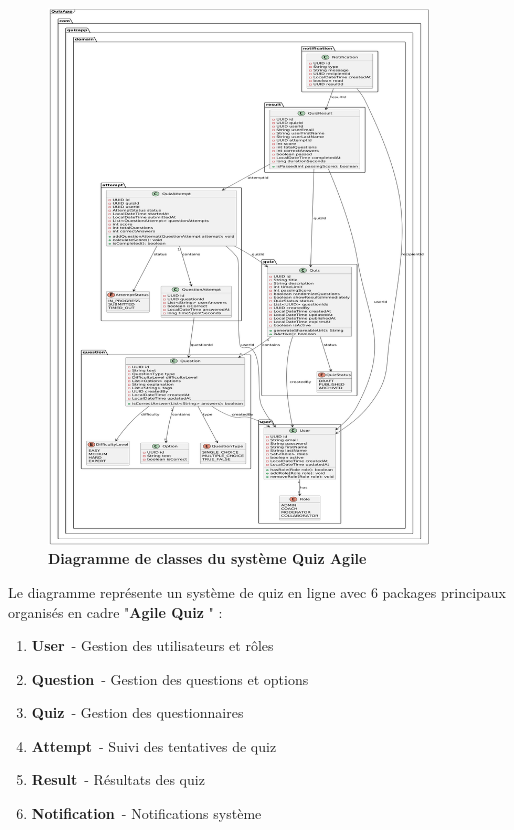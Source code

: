 \documentclass[12pt,a4paper,twoside,openright]{report}
\newcommand{\figcaption}[1]{\caption{\textbf{#1}}}
\begin{document}
\begin{figure}[H]
\centering
\includegraphics[width=0.9\textwidth]{latex_media/media/image16.png}
\figcaption{Diagramme de classes du système Quiz Agile}
\label{fig:diagramme-classes}
\end{figure}

Le diagramme représente un système de quiz en ligne avec 6 packages
principaux organisés en cadre "\textbf{Agile Quiz} " :

\begin{enumerate}
\def\labelenumi{\arabic{enumi}.}
\item
  \textbf{User}~- Gestion des utilisateurs et rôles
\item
  \textbf{Question}~- Gestion des questions et options
\item
  \textbf{Quiz}~- Gestion des questionnaires
\item
  \textbf{Attempt}~- Suivi des tentatives de quiz
\item
  \textbf{Result}~- Résultats des quiz
\item
  \textbf{Notification}~- Notifications système
\end{enumerate}
\end{document}
